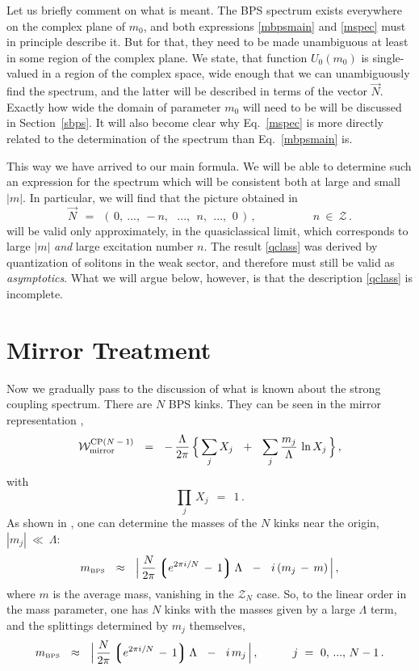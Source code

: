 \documentclass[epsfig,12pt]{article}
\def\beq{\begin{equation}}
\def\eeq{\end{equation}}
\def\beq{\begin{equation}}
\def\eeq{\end{equation}}
\newcommand{\mc}[1]{\mathcal{#1}}
\newcommand{\lgr}{\left\lgroup}
\newcommand{\rgr}{\right\rgroup}
\newcommand{\mbps}{m_{\text{\tiny BPS}}}
\newcommand{\W}{\mathcal{W}}
\begin{document}
	Let us briefly comment on what is meant.
	The BPS spectrum exists everywhere on the complex plane of $ m_0 $, and both expressions \eqref{mbpsmain}
	and \eqref{mspec} must in principle describe it.
	But for that, they need to be made unambiguous at least in some region of the complex plane. 
	We state, that function $ U_0(m_0) $ is single-valued in a region of the complex space,
	wide enough that we can unambiguously find the spectrum, and the latter will be described
	in terms of the vector $ \vec{N} $.
	Exactly how wide the domain of parameter $ m_0 $ will need to be will be discussed in Section~\ref{sbps}.
	It will also become clear why Eq.~\eqref{mspec} is more directly related to the determination 
	of the spectrum than Eq.~\eqref{mbpsmain} is.
	
	This way we have arrived to our main formula.
	We will be able to determine such an expression for the spectrum which will be consistent 
	both at large and small $ |m| $.
	In particular, we will find that the picture obtained in \cite{Dor} 
\beq
\label{qclass}
	\vec{N} ~~=~~ (\, 0,~ ...,~ -n, ~~~...,~~ n,~~ ...,~\, 0\, )\,, 
	\qquad\qquad\quad     n~\in~\mc{Z}\,.
\eeq
	will be valid only approximately, in the quasiclassical limit, which corresponds 
	to large $ |m| $ {\it and} large excitation number $ n $.
	The result \eqref{qclass} was derived by quantization of solitons in the weak sector, 
	and therefore must still be valid as {\it asymptotics}.
	What we will argue below, however, is that the description \eqref{qclass} is incomplete.


\section{Mirror Treatment}

	Now we gradually pass to the discussion of what is known 
	about the strong coupling spectrum.
	There are $ N $ BPS kinks.
	They can be seen in the mirror representation \cite{MR1}, 
\beq
\label{mirror}
	\W_\text{mirror}^\text{CP($N-1$)} ~~=~~
		-\, \frac{\Lambda}{2\pi}\, 
		\Bigl\{\, \sum_j X_j ~~+~~ \sum_j \frac{m_j}{\Lambda}\, \ln X_j \,\Bigr\}\,,
\eeq
	with
\beq
	\prod_j\, X_j ~~=~~ 1\,.
\eeq
	As shown in \cite{Shifman:2010id}, one can determine the masses of the $ N $ kinks
	near the origin, $ | m_j | ~\ll~ \Lambda $:
\beq
\label{mirrorm}
	\mbps ~~\approx~~ \Big|\, \frac{N}{2\pi} \lgr e^{2\pi i / N} \,-\, 1 \rgr \Lambda
			   ~~-~~ i\, ( m_j \,-\, m ) \,\Big|\,,
\eeq
	where $ m $ is the average mass, vanishing in the $ \mc{Z}_N $ case.
	So, to the linear order in the mass parameter, one has $ N $ kinks with the masses given
	by a large $ \Lambda $ term, and the splittings determined by $ m_j $ themselves,
\beq
\label{smirror}
	\mbps ~~\approx~~ \Big|\, \frac{N}{2\pi} \lgr e^{2\pi i / N} \,-\, 1 \rgr \Lambda
			   ~~-~~ i\, m_j \,\Big|\,,
	\qquad\quad j~=~ 0,\,...,\, N-1\,.
\eeq
\end{document}
